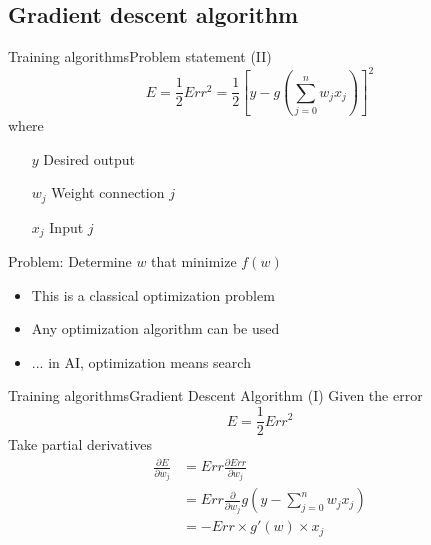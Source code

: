\documentclass[10pt,compress]{beamer} %
\begin{document}
\subsection{Gradient descent algorithm}
\begin{frame}{Training algorithms}{Problem statement (II)}
		\begin{equation*}
		E = \frac{1}{2} Err^2 = \frac{1}{2} \left[y-g\left(\sum_{j=0}^n w_j x_j\right)\right]^2
		\end{equation*}
		where
		\begin{flushleft}
		\begin{itemize}
		\item[$y$] Desired output
		\item[$w_j$] Weight connection $j$
		\item[$x_j$] Input $j$
		\end{itemize}
		\end{flushleft}

		Problem: Determine $w$ that minimize $f(w)$
		\begin{itemize}
			\item This is a classical optimization problem
			\item Any optimization algorithm can be used
			\item ... in AI, optimization means search
		\end{itemize}
\end{frame}

\begin{frame}{Training algorithms}{Gradient Descent Algorithm (I)}
	Given the error
		\begin{equation*}
		E = \frac{1}{2} Err^2
		\end{equation*}
	Take partial derivatives
		\begin{equation*}
		\begin{split}
		\frac{\partial E}{\partial w_j} &= Err \frac{\partial Err}{\partial w_j}\\
										&= Err \frac{\partial}{\partial w_j} g\left(y-\sum_{j=0}^n w_j x_j\right)\\
										&= -Err \times g'(w) \times x_j
		\end{split}
		\end{equation*}
\end{frame}
\end{document}
